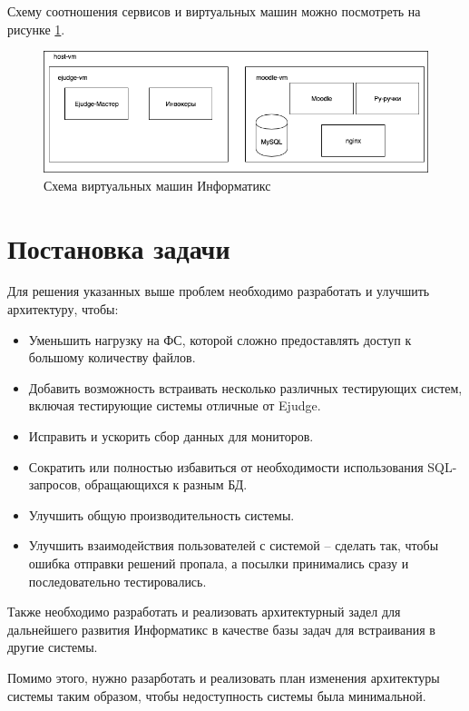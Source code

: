 Схему соотношения сервисов и виртуальных машин можно посмотреть на рисунке \ref{fig:old_vm}.

\begin{figure}
  \centering
  \includegraphics[width=\textwidth]{figures/old_vm.png}
  \caption{Схема виртуальных машин Информатикс}
  \label{fig:old_vm}
\end{figure}

\section{Постановка задачи}

Для решения указанных выше проблем необходимо разработать и улучшить архитектуру, чтобы:

\begin{itemize}
    \item Уменьшить нагрузку на ФС, которой сложно предоставлять доступ к большому количеству файлов.
    \item Добавить возможность встраивать несколько различных тестирующих систем, включая тестирующие системы отличные от Ejudge.
    \item Исправить и ускорить сбор данных для мониторов.
    \item Сократить или полностью избавиться от необходимости использования SQL-запросов, обращающихся к разным БД.
    \item Улучшить общую производительность системы.
    \item Улучшить взаимодействия пользователей с системой 
    -- сделать так, чтобы ошибка отправки решений пропала,
    а посылки принимались сразу и последовательно тестировались.
\end{itemize}

Также необходимо разработать и реализовать архитектурный задел для дальнейшего развития Информатикс в качестве базы задач для встраивания в другие системы.

Помимо этого, нужно разарботать и реализовать план изменения архитектуры системы таким образом, чтобы недоступность системы была минимальной.